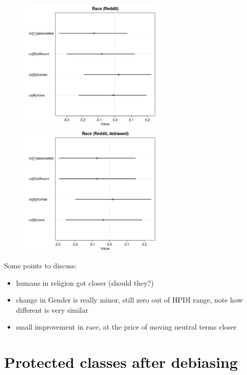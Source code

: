 \documentclass[12pt,]{book}
\begin{document}
\begin{center}
\begin{figure}[!htb]
   
  \begin{minipage}{0.55\textwidth}
\includegraphics[width=7cm]{../images/raceCoeffs.jpeg}
\end{minipage}
   \begin {minipage}{0.43\textwidth}
    \includegraphics[width=7cm]{../images/debiasedRaceRedditCoeffs.jpeg}
   \end{minipage}
\end{figure}

\end{center}


Some points to discuss:

\begin{itemize}
\item
  humans in religion got closer (should they?)
\item
  change in Gender is really minor, still zero out of HPDI range, note
  how different is very similar
\item
  small improvement in race, at the price of moving neutral terms closer
\end{itemize}

\section{Protected classes after
debiasing}\label{protected-classes-after-debiasing}
\end{document}

